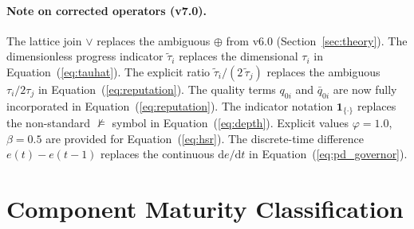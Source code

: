 \documentclass[11pt,a4paper]{article}
\theoremstyle{plain}
\theoremstyle{definition}
\theoremstyle{remark}
\newcommand{\tauhat}{\tilde{\tau}}
\newcommand{\indicator}[1]{\mathbf{1}_{\{#1\}}}
\newcommand{\qbar}{\bar{q}_{0i}}
\begin{document}
\paragraph{Note on corrected operators (v7.0).}
The lattice join $\vee$ replaces the ambiguous $\oplus$ from v6.0 (Section~\ref{sec:theory}).
The dimensionless progress indicator $\tauhat_i$ replaces the dimensional $\tau_i$ in
Equation~(\ref{eq:tauhat}).
The explicit ratio $\tauhat_i/(2\,\tauhat_j)$ replaces the ambiguous $\tau_i/2\tau_j$ in
Equation~(\ref{eq:reputation}).
The quality terms $q_{0i}$ and $\qbar$ are now fully incorporated in
Equation~(\ref{eq:reputation}).
The indicator notation $\indicator{\cdot}$ replaces the non-standard $\not\models$ symbol
in Equation~(\ref{eq:depth}).
Explicit values $\varphi=1.0$, $\beta=0.5$ are provided for Equation~(\ref{eq:hsr}).
The discrete-time difference $e(t)-e(t-1)$ replaces the continuous $\mathrm{d}e/\mathrm{d}t$
in Equation~(\ref{eq:pd_governor}).

\section{Component Maturity Classification}
\label{app:maturity}
\end{document}
